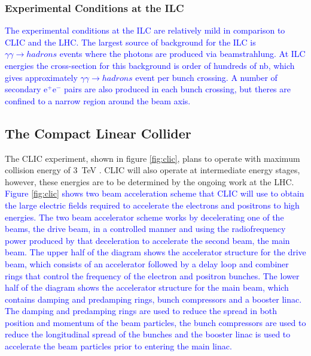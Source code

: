 \subsubsection{Experimental Conditions at the ILC}
\textcolor{blue}{The experimental conditions at the ILC are relatively mild in comparison to CLIC and the LHC.  The largest source of background for the ILC is $\gamma\gamma \rightarrow hadrons$ events where the photons are produced via beamstrahlung.  At ILC energies the cross-section for this background is order of hundreds of nb, which gives approximately $\gamma\gamma \rightarrow hadrons$ event per bunch crossing.  A number of secondary $\text{e}^{+}\text{e}^{-}$ pairs are also produced in each bunch crossing, but theres are confined to a narrow region around the beam axis.}


\subsection{The Compact Linear Collider}
The CLIC experiment, shown in figure \ref{fig:clic}, plans to operate with maximum collision energy of 3~TeV \cite{Linssen:2012hp, CLIC:2016zwp}.  CLIC will also operate at intermediate energy stages, however, these energies are to be determined by the ongoing work at the LHC.  \textcolor{blue}{Figure \ref{fig:clic} shows two beam acceleration scheme \cite{Aicheler:2012bya} that CLIC will use to obtain the large electric fields required to accelerate the electrons and positrons to high energies.  The two beam accelerator scheme works by decelerating one of the beams, the drive beam, in a controlled manner and using the radiofrequency power produced by that deceleration to accelerate the second beam, the main beam.  The upper half of the diagram shows the accelerator structure for the drive beam, which consists of an accelerator followed by a delay loop and combiner rings that control the frequency of the electron and positron bunches.  The lower half of the diagram shows the accelerator structure for the main beam, which contains damping and predamping rings, bunch compressors and a booster linac.  The damping and predamping rings are used to reduce the spread in both position and momentum of the beam particles, the bunch compressors are used to reduce the longitudinal spread of the bunches and the booster linac is used to accelerate the beam particles prior to entering the main linac.}

